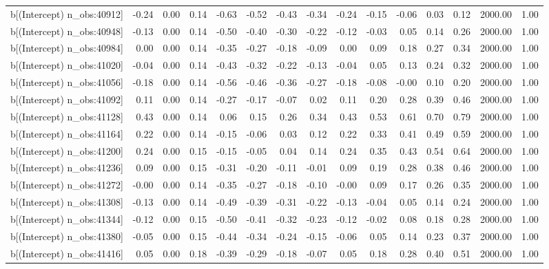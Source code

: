 \begin{table}[ht]
\begin{tabular}{rrrrrrrrrrrrrrr}
  b[(Intercept) n\_obs:40912] & -0.24 & 0.00 & 0.14 & -0.63 & -0.52 & -0.43 & -0.34 & -0.24 & -0.15 & -0.06 & 0.03 & 0.12 & 2000.00 & 1.00 \\ 
  b[(Intercept) n\_obs:40948] & -0.13 & 0.00 & 0.14 & -0.50 & -0.40 & -0.30 & -0.22 & -0.12 & -0.03 & 0.05 & 0.14 & 0.26 & 2000.00 & 1.00 \\ 
  b[(Intercept) n\_obs:40984] & 0.00 & 0.00 & 0.14 & -0.35 & -0.27 & -0.18 & -0.09 & 0.00 & 0.09 & 0.18 & 0.27 & 0.34 & 2000.00 & 1.00 \\ 
  b[(Intercept) n\_obs:41020] & -0.04 & 0.00 & 0.14 & -0.43 & -0.32 & -0.22 & -0.13 & -0.04 & 0.05 & 0.13 & 0.24 & 0.32 & 2000.00 & 1.00 \\ 
  b[(Intercept) n\_obs:41056] & -0.18 & 0.00 & 0.14 & -0.56 & -0.46 & -0.36 & -0.27 & -0.18 & -0.08 & -0.00 & 0.10 & 0.20 & 2000.00 & 1.00 \\ 
  b[(Intercept) n\_obs:41092] & 0.11 & 0.00 & 0.14 & -0.27 & -0.17 & -0.07 & 0.02 & 0.11 & 0.20 & 0.28 & 0.39 & 0.46 & 2000.00 & 1.00 \\ 
  b[(Intercept) n\_obs:41128] & 0.43 & 0.00 & 0.14 & 0.06 & 0.15 & 0.26 & 0.34 & 0.43 & 0.53 & 0.61 & 0.70 & 0.79 & 2000.00 & 1.00 \\ 
  b[(Intercept) n\_obs:41164] & 0.22 & 0.00 & 0.14 & -0.15 & -0.06 & 0.03 & 0.12 & 0.22 & 0.33 & 0.41 & 0.49 & 0.59 & 2000.00 & 1.00 \\ 
  b[(Intercept) n\_obs:41200] & 0.24 & 0.00 & 0.15 & -0.15 & -0.05 & 0.04 & 0.14 & 0.24 & 0.35 & 0.43 & 0.54 & 0.64 & 2000.00 & 1.00 \\ 
  b[(Intercept) n\_obs:41236] & 0.09 & 0.00 & 0.15 & -0.31 & -0.20 & -0.11 & -0.01 & 0.09 & 0.19 & 0.28 & 0.38 & 0.46 & 2000.00 & 1.00 \\ 
  b[(Intercept) n\_obs:41272] & -0.00 & 0.00 & 0.14 & -0.35 & -0.27 & -0.18 & -0.10 & -0.00 & 0.09 & 0.17 & 0.26 & 0.35 & 2000.00 & 1.00 \\ 
  b[(Intercept) n\_obs:41308] & -0.13 & 0.00 & 0.14 & -0.49 & -0.39 & -0.31 & -0.22 & -0.13 & -0.04 & 0.05 & 0.14 & 0.24 & 2000.00 & 1.00 \\ 
  b[(Intercept) n\_obs:41344] & -0.12 & 0.00 & 0.15 & -0.50 & -0.41 & -0.32 & -0.23 & -0.12 & -0.02 & 0.08 & 0.18 & 0.28 & 2000.00 & 1.00 \\ 
  b[(Intercept) n\_obs:41380] & -0.05 & 0.00 & 0.15 & -0.44 & -0.34 & -0.24 & -0.15 & -0.06 & 0.05 & 0.14 & 0.23 & 0.37 & 2000.00 & 1.00 \\ 
  b[(Intercept) n\_obs:41416] & 0.05 & 0.00 & 0.18 & -0.39 & -0.29 & -0.18 & -0.07 & 0.05 & 0.18 & 0.28 & 0.40 & 0.51 & 2000.00 & 1.00 \\ 

\end{tabular}
\end{table}
